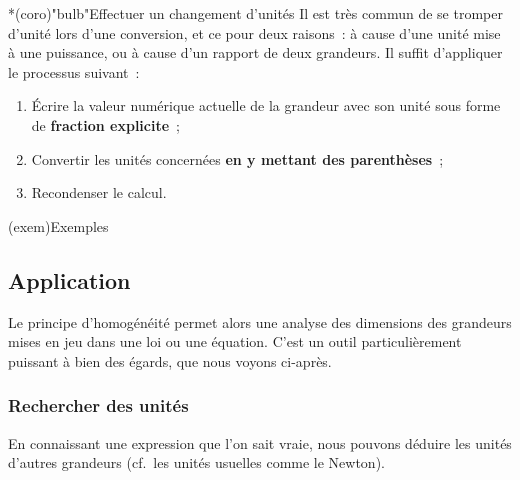 \documentclass[../main/main.tex]{subfiles}
\begin{document}
\begin{tcb}*(coro)"bulb"{Effectuer un changement d'unités}
	Il est très commun de se tromper d'unité lors d'une conversion, et ce pour
	deux raisons~: à cause d'une unité mise à une puissance, ou à cause d'un
	rapport de deux grandeurs. Il suffit d'appliquer le processus suivant~:
	\begin{enumerate}
		\item Écrire la valeur numérique actuelle de la grandeur avec son unité sous
		      forme de \textbf{fraction explicite}~;
		\item Convertir les unités concernées \textbf{en y mettant des
			      parenthèses}~;
		\item Recondenser le calcul.
	\end{enumerate}
\end{tcb}

\begin{tcb}[sidebyside](exem){Exemples}
	\vspace*{-10pt}
	\vspace*{-10pt}
	\tcblower
	\vspace*{-10pt}
\end{tcb}

\subsection{Application}

Le principe d'homogénéité permet alors une analyse des dimensions des grandeurs
mises en jeu dans une loi ou une équation. C'est un outil particulièrement
puissant à bien des égards, que nous voyons ci-après.

\subsubsection{Rechercher des unités}

En connaissant une expression que l'on sait vraie, nous pouvons déduire les
unités d'autres grandeurs (cf.\ les unités usuelles comme le Newton).
\end{document}
